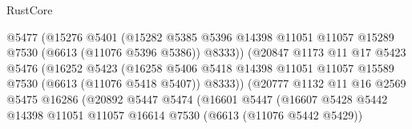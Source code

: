 \begin{lexlean}{RustCore}
\begin{coremodule}
                                      @5477
                                      (@15276
                                        @5401
                                        (@15282
                                          @5385
                                          @5396
                                          @14398
                                          @11051
                                          @11057
                                          @15289
                                          @7530
                                          (@6613 (@11076 @5396 @5386))
                                          @8333))
                                      (@20847
                                        @1173
                                        @11
                                        @17
                                        @5423
                                        @5476
                                        (@16252
                                          @5423
                                          (@16258
                                            @5406
                                            @5418
                                            @14398
                                            @11051
                                            @11057
                                            @15589
                                            @7530
                                            (@6613 (@11076 @5418 @5407))
                                            @8333))
                                        (@20777
                                          @1132
                                          @11
                                          @16
                                          @2569
                                          @5475
                                          @16286
                                          (@20892
                                            @5447
                                            @5474
                                            (@16601
                                              @5447
                                              (@16607
                                                @5428
                                                @5442
                                                @14398
                                                @11051
                                                @11057
                                                @16614
                                                @7530
                                                (@6613 (@11076 @5442 @5429))

\end{coremodule}
\end{lexlean}
